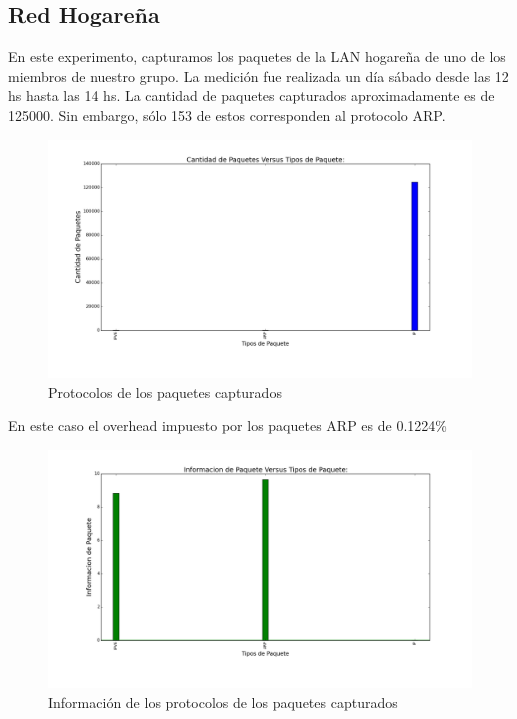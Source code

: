\subsection{Red Hogareña}

En este experimento, capturamos los paquetes de la LAN hogareña de uno de los miembros de nuestro grupo. La medición fue realizada un día sábado desde las 12 hs hasta las 14 hs. La cantidad de paquetes capturados aproximadamente es de 125000. Sin embargo, sólo 153 de estos corresponden al protocolo ARP.

\begin{figure}[H]
       \centering
       \includegraphics[width=1\textwidth]{../resultados/Casa/histogram_types.png}
       \caption{Protocolos de los paquetes capturados}
       \label{red-hogarena-types}
\end{figure}

En este caso el overhead impuesto por los paquetes ARP es de 0.1224\%

\begin{figure}[H]
       \centering
       \includegraphics[width=1\textwidth]{../resultados/Casa/histogram_types_information.png}
       \caption{Información de los protocolos de los paquetes capturados}
       \label{red-hogarena-types-info}
\end{figure}

